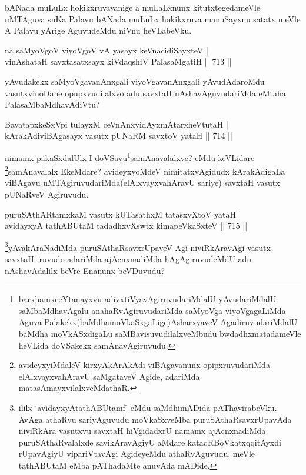 \begin{artha}
bANada muLuLx hokikxruvavanige a muLaLxnunx kitutxtegedameVle uMTAguva suKa Palavu bANada muLuLx hokikxruva manuSayxnu satatx meVle A Palavu yArige AguvudeMdu niVnu heVLabeVku.
\end{artha}

\begin{shl}
na saMyoVgoV viyoVgoV vA yasayx keVnacidiSayxteV | \\
vinAshataH savxtasatxsayx kiVdaqshiV PalasaMgatiH \hfill||  713 ||  
\end{shl}

\begin{artha}
yAvudakekx saMyoVgavanAnxgali viyoVgavanAnxgali yAvudAdaroMdu vasutxvinoDane opupxvudilalxvo adu savxtaH nAshavAguvudariMda eMtaha PalasaMbaMdhavAdiVtu?
\end{artha}


\begin{shl}
BavatapxkeSxV\s pi tulayxM ceVnAnxvidAyxmAtarxheVtutaH | \\
kArakAdiviBAgasayx vasutx pUNaRM savxtoV yataH \hfill||  714 ||  
\end{shl}

\begin{artha}
nimamx pakaSxdalUlx I doVSavu\footnote{barxhamxceYtanayxvu adivxtiVyavAgiruvudariMdalU yAvudariMdalU saMbaMdhavAgalu anahaRvAgiruvudariMda saMyoVga viyoVgagaLiMda Aguva Palakekx(baMdhamoVkaSxgaLige)AsharxyaveV AgadiruvudariMdalU baMdha moVkASxdigaLu saMBavisuvudilalxveMbudu bwdadhxmatadameVle heVLida doVSakekx samAnavAgiruvudu.}samAnavalalxve? eMdu keVLidare \footnote{avideyxyiMdaleV kirxyAkArAkAdi viBAgavanunx opipxruvudariMda elAlxvayxvahAravU saMgataveV Agide, adariMda matasAmayxvilalxveMdathaR.}samAnavalalx EkeMdare? avideyxyoMdeV nimitatxvAgidudx kArakAdigaLa viBAgavu uMTAgiruvudariMda(elAlxvayxvahAravU sariye) savxtaH vasutx pUNaRveV Agiruvudu.
\end{artha}


\begin{shl}
puruSAthARtamxkaM vasutx kUTasathxM tatasxvXtoV yataH | \\
avidayxyA tathABUtaM tadadhxvXswtx kimapeVkaSxteV \hfill||  715 ||  
\end{shl}

\begin{artha}
\footnote{ililx `avidayxyA\s tathABUtamf' eMdu saMdhimADida pAThavirabeVku. AvAga athaRvu sariyAguvudu moVkaSxveMba puruSAthaRsavxrUpavAda niviRkAra vasutxvu savxtaH hiVgidadxrU namamx ajAcnxnadiMda puruSAthaRvalalxde savikAravAgiyU aMdare kataqRBoVkatxqqitAyxdi rUpavAgiyU vipariVtavAgi AgideyeMdu athaRvAguvudu, meVle tathABUtaM eMba pAThadaMte anuvAda mADide.}yAvakAraNadiMda puruSAthaRsavxrUpaveV Agi niviRkAravAgi vasutx savxtaH iruvudo adariMda ajAcnxnadiMda hAgAgiruvudeMdU adu nAshavAdalilx beVre Enanunx beVDuvudu?
\end{artha}

